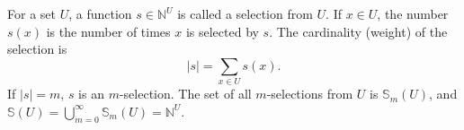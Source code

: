 For a set $U$, a function $s \in \mathbb{N}^U$ is called a selection from $U$. If $x \in U$, the number $s(x)$ is the number of times $x$ is selected by $s$. The cardinality (weight) of the selection is
$$|s| = \sum_{x \in U} s(x).$$
If $|s| = m$, $s$ is an $m$-selection. The set of all $m$-selections from $U$ is $\mathbb{S}_m(U)$, and $\mathbb{S}(U) = \bigcup_{m=0}^{\infty} \mathbb{S}_m(U) = \mathbb{N}^U$.
